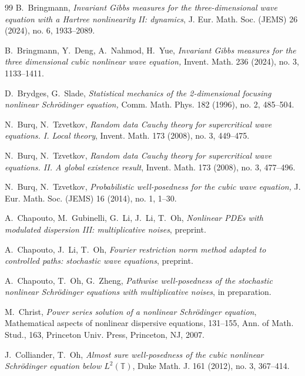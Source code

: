 \documentclass[%
11pt,  reqno]{amsart}
\newcommand{\1}{\hspace{0.2mm}\text{I}\hspace{0.2mm}}
\newcommand{\T}{\mathbb{T}}
\numberwithin{equation}{section}
\numberwithin{theorem}{section}
\begin{document}
\begin{thebibliography}{99}
B.~Bringmann, 
{\it Invariant Gibbs measures for the three-dimensional wave equation with a Hartree nonlinearity II: dynamics},
 J. Eur. Math. Soc. (JEMS) 26 (2024), no. 6, 1933--2089.







B.~Bringmann, Y.~Deng, A.~Nahmod, H.~Yue, 
{\it Invariant Gibbs measures for the three dimensional cubic nonlinear wave equation,}
 Invent. Math. 236 (2024), no. 3, 1133--1411. 

D.~Brydges, G.~Slade, 
{\it Statistical mechanics of the 2-dimensional focusing nonlinear Schr\"odinger equation,} Comm. Math. Phys. 182 (1996), no. 2, 485--504.


N.~Burq, N.~Tzvetkov, 
{\it Random data Cauchy theory for supercritical wave equations. I. Local theory},
 Invent. Math. 173 (2008), no. 3, 449--475.


N.~Burq, N.~Tzvetkov, 
{\it 
Random data Cauchy theory for supercritical wave equations. II. A global existence result},
 Invent. Math. 173 (2008), no. 3, 477--496.


N.~Burq, N.~Tzvetkov, 
{\it 
Probabilistic well-posedness for the cubic wave equation,}
 J. Eur. Math. Soc. (JEMS) 16 (2014), no. 1, 1--30. 


A.~Chapouto, M.~Gubinelli, G.~Li, J.~Li, T.~Oh, 
{\it  Nonlinear PDEs with modulated dispersion III: multiplicative noises}, 
preprint.

A.~Chapouto, J.~Li, T.~Oh,
{\it Fourier restriction norm method adapted to controlled paths: stochastic wave equations},
preprint.

A.~Chapouto, T.~Oh, G.~Zheng, 
{\it 
Pathwise well-posedness of
the stochastic nonlinear Schr\"odinger equations
with multiplicative noises},
in preparation.



M.~Christ, 
{\it Power series solution of a nonlinear Schr\"odinger equation}, Mathematical aspects of nonlinear dispersive equations, 131--155, Ann. of Math. Stud., 163, Princeton Univ. Press, Princeton, NJ, 2007.

J.~Colliander, T.~Oh,
{\it  Almost sure well-posedness of the cubic nonlinear Schr\"odinger equation below $L^2(\T)$}, Duke Math. J. 161 (2012), no. 3, 367--414. 



\end{thebibliography}
\end{document}
